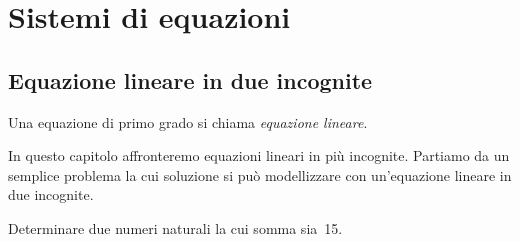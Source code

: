 


\chapter{Sistemi di equazioni}


\section{Equazione lineare in due incognite}
\label{sec:sist_eqdue}
\begin{definizione}{}{}
Una equazione di primo grado si chiama \emph{equazione lineare}.
\end{definizione}

In questo capitolo affronteremo equazioni lineari in più incognite. 
Partiamo da un semplice problema la cui soluzione si può modellizzare 
con un'equazione lineare in due incognite.

\begin{problema}{}{}
Determinare due numeri naturali la cui somma sia~15.
\end{problema}

